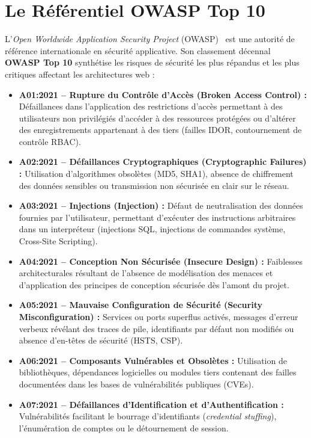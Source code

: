 \section{Le R\'ef\'erentiel OWASP Top 10}
\par L'\textit{Open Worldwide Application Security Project} (OWASP)~\cite{owasp2021} est une autorit\'e de r\'ef\'erence internationale en s\'ecurit\'e applicative. Son classement d\'ecennal \textbf{OWASP Top 10} synth\'etise les risques de s\'ecurit\'e les plus r\'epandus et les plus critiques affectant les architectures web :
\begin{itemize}
    \item \textbf{A01:2021 -- Rupture du Contr\^ole d'Acc\`es (Broken Access Control) :} D\'efaillances dans l'application des restrictions d'acc\`es permettant \`a des utilisateurs non privil\'egi\'es d'acc\'eder \`a des ressources prot\'eg\'ees ou d'alt\'erer des enregistrements appartenant \`a des tiers (failles IDOR, contournement de contr\^ole RBAC).
    \item \textbf{A02:2021 -- D\'efaillances Cryptographiques (Cryptographic Failures) :} Utilisation d'algorithmes obsol\`etes (MD5, SHA1), absence de chiffrement des donn\'ees sensibles ou transmission non s\'ecuris\'ee en clair sur le r\'eseau.
    \item \textbf{A03:2021 -- Injections (Injection) :} D\'efaut de neutralisation des donn\'ees fournies par l'utilisateur, permettant d'ex\'ecuter des instructions arbitraires dans un interpr\'eteur (injections SQL, injections de commandes syst\`eme, Cross-Site Scripting).
    \item \textbf{A04:2021 -- Conception Non S\'ecuris\'ee (Insecure Design) :} Faiblesses architecturales r\'esultant de l'absence de mod\'elisation des menaces et d'application des principes de conception s\'ecuris\'ee d\`es l'amont du projet.
    \item \textbf{A05:2021 -- Mauvaise Configuration de S\'ecurit\'e (Security Misconfiguration) :} Services ou ports superflus activ\'es, messages d'erreur verbeux r\'ev\'elant des traces de pile, identifiants par d\'efaut non modifi\'es ou absence d'en-t\^etes de s\'ecurit\'e (HSTS, CSP).
    \item \textbf{A06:2021 -- Composants Vuln\'erables et Obsol\`etes :} Utilisation de biblioth\`eques, d\'ependances logicielles ou modules tiers contenant des failles document\'ees dans les bases de vuln\'erabilit\'es publiques (CVEs).
    \item \textbf{A07:2021 -- D\'efaillances d'Identification et d'Authentification :} Vuln\'erabilit\'es facilitant le bourrage d'identifiants (\textit{credential stuffing}), l'\'enum\'eration de comptes ou le d\'etournement de session.

\end{itemize}
